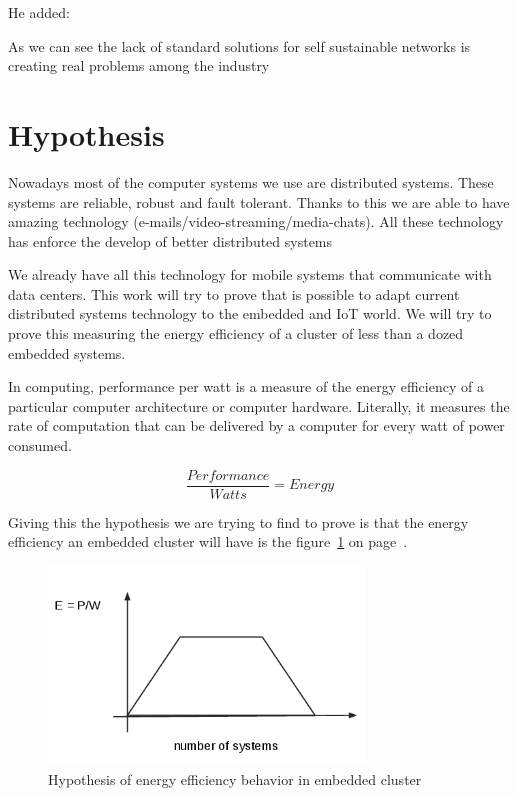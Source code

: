 He added: 


As we can see the lack of standard solutions for self sustainable networks is 
creating real problems among the industry


\section{Hypothesis}
\noindent

Nowadays most of the computer systems we use are distributed systems. These
systems are reliable, robust and fault tolerant. Thanks to this we are able to
have amazing technology (e-mails/video-streaming/media-chats). All these
technology has enforce the develop of better distributed systems

We already have all this technology for mobile systems that communicate with
data centers. This work will try to prove that is possible to adapt current
distributed systems technology to the embedded and IoT world. We will try to
prove this measuring the energy efficiency of a cluster of less than a dozed 
embedded systems. 

In computing, performance per watt is a measure of the energy efficiency of a
particular computer architecture or computer hardware. Literally, it measures
the rate of computation that can be delivered by a computer for every watt of
power consumed. 



\begin{equation}
    \dfrac {Performance}{Watts} = Energy
\end{equation}

Giving this the hypothesis we are trying to find to prove is that the energy
efficiency an embedded cluster will have is the 
figure~\ref{fig:1.2} on page~\pageref{fig:1.2}.


\begin{figure}[H]
\centering
\includegraphics[width=0.75\textwidth]{images/graph_1.png}
\caption{Hypothesis of energy efficiency behavior in embedded cluster}
\label{fig:1.2}
\end{figure}

